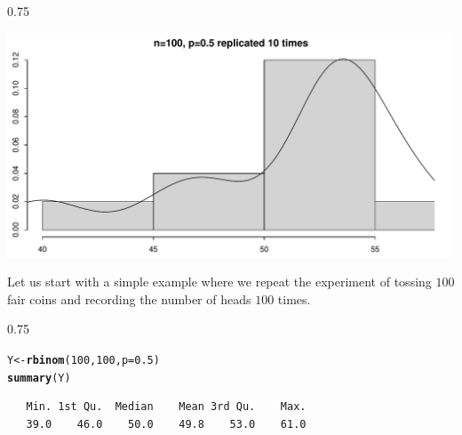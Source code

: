 \documentclass{beamer}\usepackage[]{graphicx}\usepackage[]{color}
\makeatletter
\newcommand{\hlnum}[1]{\textcolor[rgb]{0.2,0.2,0.2}{#1}}%
\newcommand{\hlstd}[1]{\textcolor[rgb]{0.102,0.102,0.102}{#1}}%
\newcommand{\hlkwb}[1]{\textcolor[rgb]{0.102,0.102,0.102}{#1}}%
\newcommand{\hlkwc}[1]{\textcolor[rgb]{0.2,0.2,0.2}{#1}}%
\newcommand{\hlkwd}[1]{\textcolor[rgb]{0.102,0.102,0.102}{\textbf{#1}}}%
\newenvironment{kframe}{%
 \def\at@end@of@kframe{}%
 \ifinner\ifhmode%
  \def\at@end@of@kframe{\end{minipage}}%
  \begin{minipage}{\columnwidth}%
 \fi\fi%
 \def\FrameCommand##1{\hskip\@totalleftmargin \hskip-\fboxsep
 \colorbox{shadecolor}{##1}\hskip-\fboxsep
     \hskip-\linewidth \hskip-\@totalleftmargin \hskip\columnwidth}%
 \MakeFramed {\advance\hsize-\width
   \@totalleftmargin\z@ \linewidth\hsize
   \@setminipage}}%
 {\par\unskip\endMakeFramed%
 \at@end@of@kframe}
\newenvironment{knitrout}{}{} %
\renewenvironment{knitrout}{\begin{spacing}{0.75}\begin{tiny}}{\end{tiny}\end{spacing}}
\makeatother
\begin{document}
\begin{frame}[fragile]

\begin{knitrout}\small
{}\color{fgcolor}

{\centering \includegraphics[width=0.89\linewidth]{figure/graphics-unnamed-chunk-3-1} 

}



\end{knitrout}

\end{frame}

\begin{frame}[fragile]

Let us start with a simple example where we repeat the experiment of tossing
$100$ fair coins and recording the number of heads $100$ times.

\begin{knitrout}\small
{}\color{fgcolor}\begin{kframe}
\begin{alltt}
\hlstd{Y} \hlkwb{<-} \hlkwd{rbinom}\hlstd{(}\hlnum{100}\hlstd{,} \hlnum{100}\hlstd{,} \hlkwc{p}\hlstd{=}\hlnum{0.5}\hlstd{)}
\hlkwd{summary}\hlstd{(Y)}
\end{alltt}
\begin{verbatim}
   Min. 1st Qu.  Median    Mean 3rd Qu.    Max. 
   39.0    46.0    50.0    49.8    53.0    61.0 
\end{verbatim}
\end{kframe}
\end{knitrout}

\end{frame}
\end{document}
